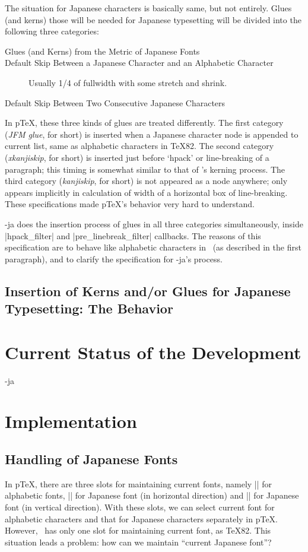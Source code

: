 \documentclass{ajt}
\begin{document}
The situation for Japanese characters is basically same, but not entirely.
Glues (and kerns) those will be needed for Japanese typesetting will be divided into the following three categories:
\begin{description}
\item[Glues (and Kerns) from the Metric of Japanese Fonts] 
\item[Default Skip Between a Japanese Character and an Alphabetic Character] 
Usually 1/4 of fullwidth with some stretch and shrink.
\item[Default Skip Between Two Consecutive Japanese Characters] 
\end{description}
In p\TeX, these three kinds of glues are treated differently. The first
 category (\emph{JFM glue}, for short) is inserted when a Japanese
 character node is appended to current list, same as alphabetic
 characters in \TeX82. The second category (\emph{xkanjiskip}, for
 short) is inserted just before `hpack' or line-breaking of a paragraph;
 this timing is somewhat similar to that of \LuaTeX's kerning
 process. The third category (\emph{kanjiskip}, for short) is not
 appeared as a node anywhere; only appears implicitly in calculation of
 width of a horizontal box of line-breaking. These specifications made
 p\TeX's behavior very hard to understand.

\LuaTeX-ja does the insertion process of glues in all three categories
simultaneously, inside |hpack_filter| and |pre_linebreak_filter|
callbacks.  The reasons of this specification are to behave like
alphabetic characters in \LuaTeX\ (as described in the first paragraph),
and to clarify the specification for \LuaTeX-ja's process.


\subsection{Insertion of Kerns and/or Glues for Japanese Typesetting: The Behavior}



\section{Current Status of the Development}
\LuaTeX-ja 

\section{Implementation}
\subsection{Handling of Japanese Fonts}
In p\TeX, there are three slots for maintaining current fonts, namely
|\font| for alphabetic fonts, |\jfont| for Japanese font (in horizontal
direction) and |\tfont| for Japanese font (in vertical direction). With these slots, we can select
current font for alphabetic characters and that for Japanese characters separately in p\TeX.
However, \LuaTeX\ has only one slot for maintaining current font, as \TeX82. 
This situation leads a problem: how can we maintain ``current Japanese font''?
\end{document}

